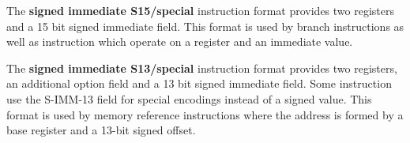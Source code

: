 The \textbf{signed immediate S15/special} instruction format provides two registers and a 15 bit signed immediate field. This format is used by branch instructions as well as instruction which operate on a register and an immediate value.

\begin{figure}[H]
\begin{center}
\end{center}
\end{figure}

The \textbf{signed immediate S13/special} instruction format provides two registers, an additional option field  and a 13 bit signed immediate field. Some instruction use the S-IMM-13 field for special encodings instead of a signed value. This format is used by memory reference instructions where the address is formed by a base register and a 13-bit signed offset.

